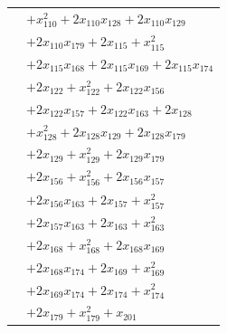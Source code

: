 \begin{longtable}{@{}r@{\;}l@{}}
 & \(\displaystyle +x_{110}^{2} +2x_{110}x_{128} +2x_{110}x_{129}\) \\
 & \(\displaystyle +2x_{110}x_{179} +2x_{115} +x_{115}^{2}\) \\
 & \(\displaystyle +2x_{115}x_{168} +2x_{115}x_{169} +2x_{115}x_{174}\) \\
 & \(\displaystyle +2x_{122} +x_{122}^{2} +2x_{122}x_{156}\) \\
 & \(\displaystyle +2x_{122}x_{157} +2x_{122}x_{163} +2x_{128}\) \\
 & \(\displaystyle +x_{128}^{2} +2x_{128}x_{129} +2x_{128}x_{179}\) \\
 & \(\displaystyle +2x_{129} +x_{129}^{2} +2x_{129}x_{179}\) \\
 & \(\displaystyle +2x_{156} +x_{156}^{2} +2x_{156}x_{157}\) \\
 & \(\displaystyle +2x_{156}x_{163} +2x_{157} +x_{157}^{2}\) \\
 & \(\displaystyle +2x_{157}x_{163} +2x_{163} +x_{163}^{2}\) \\
 & \(\displaystyle +2x_{168} +x_{168}^{2} +2x_{168}x_{169}\) \\
 & \(\displaystyle +2x_{168}x_{174} +2x_{169} +x_{169}^{2}\) \\
 & \(\displaystyle +2x_{169}x_{174} +2x_{174} +x_{174}^{2}\) \\
 & \(\displaystyle +2x_{179} +x_{179}^{2} +x_{201}\) \\[3pt]
\end{longtable}
\endgroup
